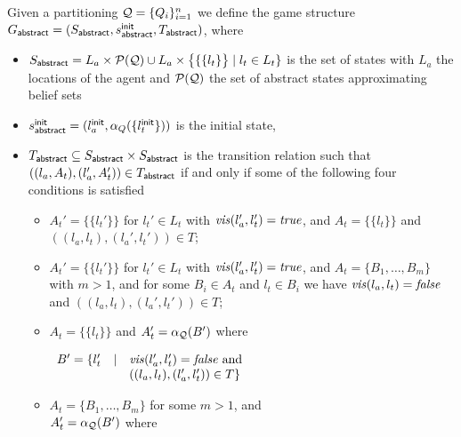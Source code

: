 Given a partitioning $\mathcal{Q} = \{Q_i\}_{i=1}^n$ we define the game structure 
$G_{\mathsf{abstract}}  = (S_{\mathsf{abstract}},s^{\mathsf{init}}_{\mathsf{abstract}},T_{\mathsf{abstract}})$, where
\begin{itemize}
\item $S_{\mathsf{abstract}} = L_a \times \mathcal P(\mathcal{Q}) \cup L_a \times \big\{\{\{l_t\}\big\} \mid l_t \in L_t\}$ is the set of states with $L_a$ the locations of the agent and $\mathcal P(\mathcal{Q})$ the set of abstract states approximating belief sets
\item $s^{\mathsf{init}}_{\mathsf{abstract}} = (l_a^{\mathsf{init}},\alpha_Q(\{l_t^{\mathsf{init}}\}))$ is the initial state,
\item $T_{\mathsf{abstract}} \subseteq S_{\mathsf{abstract}} \times S_{\mathsf{abstract}}$ is the transition relation such that $((l_a, A_t),(l_a', A_t')) \in T_{\mathsf{abstract}}$ if and only if some of the following four conditions is satisfied
\begin{itemize}

\item $A_t' = \{\{l_t'\}\}$ for $l_t' \in L_t$ with $\mathit{vis}(l_a',l_t') = \mathit{true}$, and 
$A_t = \{\{l_t\}\}$ and $((l_a,l_t),(l_a',l_t')) \in T$;
\item $A_t' = \{\{l_t'\}\}$ for $l_t' \in L_t$ with $\mathit{vis}(l_a',l_t') = \mathit{true}$, and
$A_t = \{B_1,\ldots,B_m\}$ with $m > 1$, and for some $B_i \in A_t$ and $l_t \in B_i$ we have $\mathit{vis}(l_a,l_t) = \mathit{false}$ and $((l_a,l_t),(l_a',l_t')) \in T$;


\item $A_t = \{\{l_t\}\}$ and $A_t' = \alpha_{\mathcal{Q}}(B')$ where

$\begin{array}{lll}
B' = \{l_t' & \mid & \mathit{vis}(l_a',l_t') = \mathit{false} \text{ and }\\
&& ((l_a,l_t),(l_a',l_t')) \in T\}
\end{array}
$

\item $A_t = \{B_1,\ldots,B_m\}$ for some $m > 1$, and\\ $A_t' = \alpha_{\mathcal{Q}}(B')$ where


\end{itemize}
\end{itemize}
